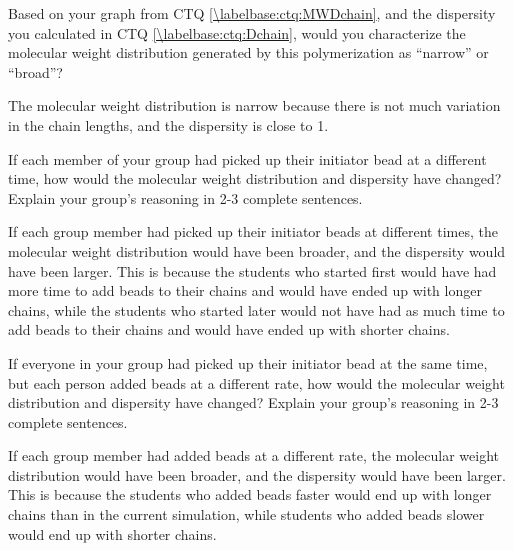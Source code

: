 \begin{activity}
\begin{ctqs}
	\question Based on your graph from CTQ \ref{\labelbase:ctq:MWDchain}, and the dispersity you calculated in CTQ \ref{\labelbase:ctq:Dchain}, would you characterize the molecular weight distribution generated by this polymerization as ``narrow'' or ``broad''?  %
	
		\begin{solution}[1in]
			The molecular weight distribution is narrow because there is not much variation in the chain lengths, and the dispersity is close to 1.
		\end{solution}
	
	\question If each member of your group had picked up their initiator bead at a different time, how would the molecular weight distribution and dispersity have changed?  Explain your group's reasoning in 2-3 complete sentences.
	
		\begin{solution}[1.9in]
			If each group member had picked up their initiator beads at different times, the molecular weight distribution would have been broader, and the dispersity would have been larger.  This is because the students who started first would have had more time to add beads to their chains and would have ended up with longer chains, while the students who started later would not have had as much time to add beads to their chains and would have ended up with shorter chains.
		\end{solution}
	
	\question If everyone in your group had picked up their initiator bead at the same time, but each person added beads at a different rate, how would the molecular weight distribution and dispersity have changed?  Explain your group's reasoning in 2-3 complete sentences.
	
		\begin{solution}[1.9in]
			If each group member had added beads at a different rate, the molecular weight distribution would have been broader, and the dispersity would have been larger.  This is because the students who added beads faster would end up with longer chains than in the current simulation, while students who added beads slower would end up with shorter chains.
		\end{solution}
		
\end{ctqs}

\begin{model}
\label{\labelbase:mdl:stepgrowth}


\end{model}
\end{activity}
